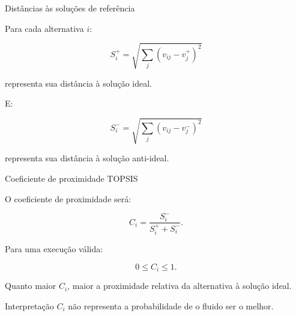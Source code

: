 
\begin{frame}{Distâncias às soluções de referência}

    Para cada alternativa \(i\):

    \[
    S_i^+
    =
    \sqrt{
    \sum_j
    (v_{ij}-v_j^+)^2
    }
    \]

    representa sua distância à solução ideal.

    \vspace{0.3cm}

    E:

    \[
    S_i^-
    =
    \sqrt{
    \sum_j
    (v_{ij}-v_j^-)^2
    }
    \]

    representa sua distância à solução anti-ideal.

\end{frame}



\begin{frame}{Coeficiente de proximidade TOPSIS}

    O coeficiente de proximidade será:

    \[
    C_i
    =
    \frac{S_i^-}
         {S_i^+ + S_i^-}.
    \]

    Para uma execução válida:

    \[
    0\leq C_i\leq1.
    \]

    \vspace{0.3cm}

    Quanto maior \(C_i\), maior a proximidade relativa da alternativa
    à solução ideal.

    \vspace{0.3cm}

    \begin{alertblock}{Interpretação}
        \(C_i\) não representa a probabilidade de o fluido ser o melhor.
    \end{alertblock}

\end{frame}



